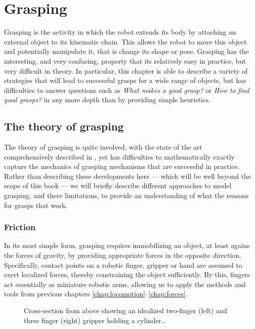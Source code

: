 \chapter{Grasping}
Grasping is the activity in which the robot extends its body by attaching an external object to its kinematic chain. This allows the robot to move this object and potentially manipulate it, that is change its shape or pose. Grasping has the interesting, and very confusing, property that its relatively easy in practice, but very difficult in theory. In particular, this chapter is able to describe a variety of strategies that will lead to successful grasps for a wide range of objects, but has difficulties to answer questions such as \emph{What makes a good grasp?} or \emph{How to find good grasps?} in any more depth than by providing simple heuristics. 

\section{The theory of grasping}
The theory of grasping is quite involved, with the state of the art comprehensively described in \cite{rimon2019mechanics}, yet has difficulties to mathematically exactly capture the mechanics of grasping mechanisms that are successful in practice. Rather than describing these developments here --- which will be well beyond the scope of this book --- we will briefly describe different approaches to model grasping, and there limitations, to provide an understanding of what the reasons for grasps that work. 

\subsection{Friction}
In its most simple form, grasping requires immobilizing an object, at least agains the forces of gravity, by providing appropriate forces in the opposite direction. Specifically, contact points on a robotic finger, gripper or hand are assumed to exert localized forces, thereby constraining the object sufficiently. By this, fingers act essentially as miniature robotic arms, allowing us to apply the methods and tools from previous chapters \ref{chap:locomotion}--\ref{chap:forces}. 

\begin{figure}
\caption{Cross-section from above showing an idealized two-finger (left) and three finger (right) gripper holding a cylinder.\label{fig:idealgrasp}.}
\end{figure}

